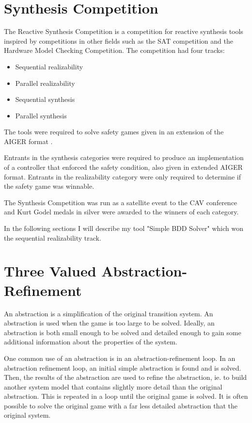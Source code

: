 \section{Synthesis Competition}

The Reactive Synthesis Competition is a competition for reactive synthesis tools inspired by competitions in other fields such as the SAT competition and the Hardware Model Checking Competition. The competition had four tracks:
\begin{itemize}
    \item Sequential realizability
    \item Parallel realizability
    \item Sequential synthesis
    \item Parallel synthesis
\end{itemize}

The tools were required to solve safety games given in an extension of the AIGER format \cite{aiger}. 

Entrants in the synthesis categories were required to produce an implementation of a controller that enforced the safety condition, also given in extended AIGER format. Entrants in the realizability category were only required to determine if the safety game was winnable.

The Synthesis Competition was run as a satellite event to the CAV conference and Kurt Godel medals in silver were awarded to the winners of each category.

In the following sections I will describe my tool "Simple BDD Solver" which won the sequential realizability track.



\section{Three Valued Abstraction-Refinement}
An abstraction is a simplification of the original transition system. An abstraction is used when the game is too large to be solved. Ideally, an abstraction is both small enough to be solved and detailed enough to gain some additional information about the properties of the system. 

One common use of an abstraction is in an abstraction-refinement loop. In an abstraction refinement loop, an initial simple abstraction is found and is solved. Then, the results of the abstraction are used to refine the abstraction, ie. to build another system model that contains slightly more detail than the original abstraction. This is repeated in a loop until the original game is solved. It is often possible to solve the original game with a far less detailed abstraction that the original system. 

